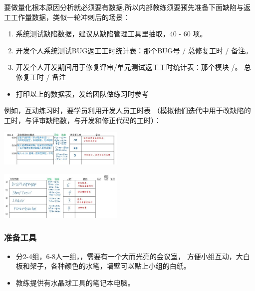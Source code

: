 要做量化根本原因分析就必须要有数据,所以内部教练须要预先准备下面缺陷与返工工作量数据，类似一轮冲刺后的场景：

\begin{enumerate}
\tightlist
\item
  系统测试缺陷数据，建议从缺陷管理工具里抽取，40 - 60 项。
\item
  开发个人系统测试BUG返工工时统计表：那个BUG号 / 总修复工时 / 备注。
\item
  开发个人开发期间用于修复评审/单元测试返工工时统计表：那个模块 /。
  总修复工时 / 备注
\end{enumerate}

\begin{itemize}
\tightlist
\item
  打印以上的数据表，发给团队做练习时参考
\end{itemize}

例如，互动练习时，要学员利用开发人员工时表
（模拟他们迭代中用于改缺陷的工时，与评审缺陷数，与开发和修正代码的工时）：


\includegraphics[width=6cm]{缺陷表41.jpg}


\includegraphics[width=6cm]{缺陷表51.jpg}

\hypertarget{ux51c6ux5907ux5de5ux5177}{%
\subsubsection{准备工具}\label{ux51c6ux5907ux5de5ux5177}}

\begin{itemize}
\tightlist
\item
  分2-4组，6-8人一组，，需要有一个大而光亮的会议室，
  方便小组互动，大白板和架子，各种颜色的水笔，墙壁可以贴上小组的白纸。
\item
  教练提供有水晶球工具的笔记本电脑。
\end{itemize}

